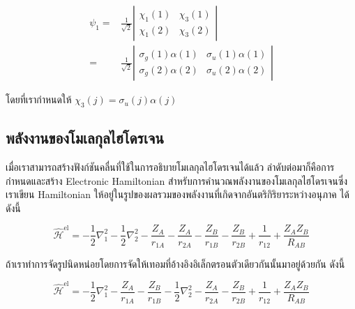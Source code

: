 \begin{equation}
    \begin{aligned}
        \psi_1 
        = & 
        \frac{1}{\sqrt{2}}
        \left|
            \begin{array}{ll}
                \chi_1(1) & \chi_3(1) \\
                \chi_1(2) & \chi_3(2)
            \end{array}
        \right| \\
        = & \frac{1}{\sqrt{2}}
        \left|
            \begin{array}{ll}
                \sigma_g(1) \alpha(1) & \sigma_u(1) \alpha(1) \\
                \sigma_g(2) \alpha(2) & \sigma_u(2) \alpha(2)
            \end{array}
        \right|
    \end{aligned}
\end{equation}

\noindent โดยที่เรากำหนดให้ $\chi_3(j) = \sigma_u(j) \alpha(j)$

\subsection{พลังงานของโมเลกุลไฮโดรเจน}

เมื่อเราสามารถสร้างฟังก์ชันคลื่นที่ใช้ในการอธิบายโมเลกุลไฮโดรเจนได้แล้ว ลำดับต่อมาก็คือการกำหนดและสร้าง Electronic Hamiltonian 
สำหรับการคำนวณพลังงานของโมเลกุลไฮโดรเจนซึ่งเราเขียน Hamiltonian ให้อยู่ในรูปของผลรวมของพลังงานที่เกิดจากอันตริกิริยาระหว่างอนุภาค%
ได้ดังนี้

\begin{equation}
    \label{eq:Hamiltonian_H2}
    \hat{\mathscr{H}}^{\mathrm{el}} 
    = 
    -\frac{1}{2} \nabla_1^2 
    -\frac{1}{2} \nabla_2^2 
    -\frac{Z_A}{r_{1 A}} 
    -\frac{Z_A}{r_{2 A}} 
    -\frac{Z_B}{r_{1 B}}
    -\frac{Z_B}{r_{2 B}}
    +\frac{1}{r_{12}}
    +\frac{Z_A Z_B}{R_{A B}}
\end{equation}

\noindent ถ้าเราทำการจัดรูปนิดหน่อยโดยการจัดให้เทอมที่อ้างอิงอิเล็กตรอนตัวเดียวกันนั้นมาอยู่ด้วยกัน ดังนี้

\begin{equation}
    \hat{\mathscr{H}}^{\mathrm{el}} 
    = 
    -\frac{1}{2} \nabla_1^2 
    -\frac{Z_A}{r_{1 A}} 
    -\frac{Z_B}{r_{1 B}}
    -\frac{1}{2} \nabla_2^2 
    -\frac{Z_A}{r_{2 A}} 
    -\frac{Z_B}{r_{2 B}}
    +\frac{1}{r_{12}}
    +\frac{Z_A Z_B}{R_{A B}}
\end{equation}

